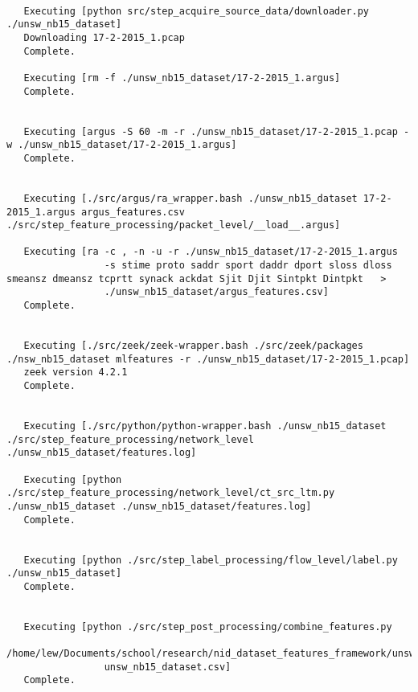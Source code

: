 \documentclass[sigconf, anonymous, screen, review]{acmart}
\begin{document}
\begin{lstlisting}[float=*, label=lst:sampleoutput, caption={
    The expected output seen in a terminal window after running our sample implementation.
    Seeing the actual commands that run alleviates any ambiguity regarding how a dataset was created in comparison to simply describing the methodology.
    Note that we have added some line breaks in the listing to make the output easier to view.
    }, captionpos=b, basicstyle=\tiny, backgroundcolor=\color{gray!10!white}, frame=stb, breaklines=True]

   Executing [python src/step_acquire_source_data/downloader.py ./unsw_nb15_dataset]
   Downloading 17-2-2015_1.pcap
   Complete.
   
   Executing [rm -f ./unsw_nb15_dataset/17-2-2015_1.argus]
   Complete.
   
   
   Executing [argus -S 60 -m -r ./unsw_nb15_dataset/17-2-2015_1.pcap -w ./unsw_nb15_dataset/17-2-2015_1.argus]
   Complete.
   
   
   Executing [./src/argus/ra_wrapper.bash ./unsw_nb15_dataset 17-2-2015_1.argus argus_features.csv ./src/step_feature_processing/packet_level/__load__.argus]
   
   Executing [ra -c , -n -u -r ./unsw_nb15_dataset/17-2-2015_1.argus 
                 -s stime proto saddr sport daddr dport sloss dloss smeansz dmeansz tcprtt synack ackdat Sjit Djit Sintpkt Dintpkt   > 
                 ./unsw_nb15_dataset/argus_features.csv]
   Complete.
   
   
   Executing [./src/zeek/zeek-wrapper.bash ./src/zeek/packages ./nsw_nb15_dataset mlfeatures -r ./unsw_nb15_dataset/17-2-2015_1.pcap]
   zeek version 4.2.1
   Complete.
   
   
   Executing [./src/python/python-wrapper.bash ./unsw_nb15_dataset ./src/step_feature_processing/network_level ./unsw_nb15_dataset/features.log]
   
   Executing [python ./src/step_feature_processing/network_level/ct_src_ltm.py ./unsw_nb15_dataset ./unsw_nb15_dataset/features.log]
   Complete.
   
   
   Executing [python ./src/step_label_processing/flow_level/label.py ./unsw_nb15_dataset]
   Complete.
   
   
   Executing [python ./src/step_post_processing/combine_features.py 
                 /home/lew/Documents/school/research/nid_dataset_features_framework/unsw_nb15_dataset 
                 unsw_nb15_dataset.csv]
   Complete.

\end{lstlisting}
\end{document}
